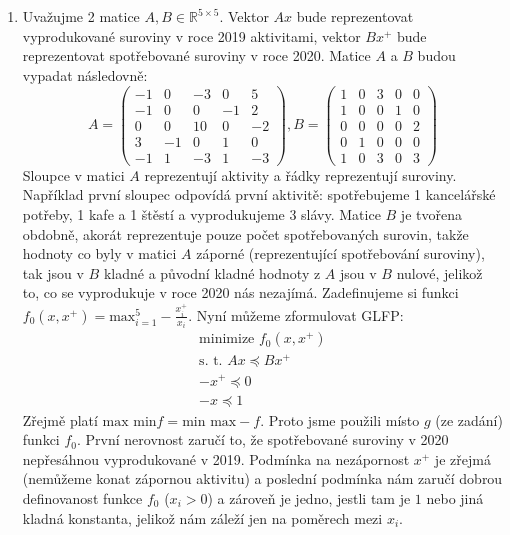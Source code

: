 \documentclass[12pt, a4paper]{article}
\begin{document}
\section{}
\begin{enumerate}[label=\alph*)]
\item Uvažujme 2 matice $A,B \in \mathbb{R}^{5 \times 5}$. Vektor $Ax$ bude reprezentovat vyprodukované suroviny v roce 2019 aktivitami, vektor $Bx^{+}$ bude reprezentovat spotřebované suroviny v roce 2020. Matice $A$ a $B$ budou vypadat následovně:
\[
A = \begin{pmatrix}
-1 & 0 & -3 & 0 & 5\\
-1 & 0 & 0 & -1 & 2\\
0 & 0 & 10 & 0 & -2\\
3 & -1 & 0 & 1 & 0\\
-1 & 1 & -3 & 1 & -3
\end{pmatrix},
B = \begin{pmatrix}
1 & 0 & 3 & 0 & 0\\
1 & 0 & 0 & 1 & 0\\
0 & 0 & 0 & 0 & 2\\
0 & 1 & 0 & 0 & 0\\
1 & 0 & 3 & 0 & 3 
\end{pmatrix}
\]
Sloupce v matici $A$ reprezentují aktivity a řádky reprezentují suroviny. Například první sloupec odpovídá první aktivitě: spotřebujeme 1 kancelářské potřeby, 1 kafe a 1 štěstí a vyprodukujeme 3 slávy. Matice $B$ je tvořena obdobně, akorát reprezentuje pouze počet spotřebovaných surovin, takže hodnoty co byly v matici $A$ záporné (reprezentující spotřebování suroviny), tak jsou v $B$ kladné a původní kladné hodnoty z $A$ jsou v $B$ nulové, jelikož to, co se vyprodukuje v roce 2020 nás nezajímá. Zadefinujeme si funkci $f_0(x,x^{+}) = \text{max}_{i=1}^5 -\frac{x_i^{+}}{x_i}$. Nyní můžeme zformulovat GLFP:
\begin{gather*}
\text{minimize } f_0(x,x^{+})\\
\text{s. t. } Ax \preceq Bx^{+}\\
-x^{+} \preceq 0\\
-x \preceq 1 
\end{gather*}
Zřejmě platí $\text{max min} f = \text{min max} -f$. Proto jsme použili místo $g$ (ze zadání) funkci $f_0$. První nerovnost zaručí to, že spotřebované suroviny v 2020 nepřesáhnou vyprodukované v 2019. Podmínka na nezápornost $x^+$ je zřejmá (nemůžeme konat zápornou aktivitu) a poslední podmínka nám zaručí dobrou definovanost funkce $f_0$ ($x_i > 0$) a zároveň je jedno, jestli tam je $1$ nebo jiná kladná konstanta, jelikož nám záleží jen na poměrech mezi $x_i$.


\end{enumerate}
\end{document}
